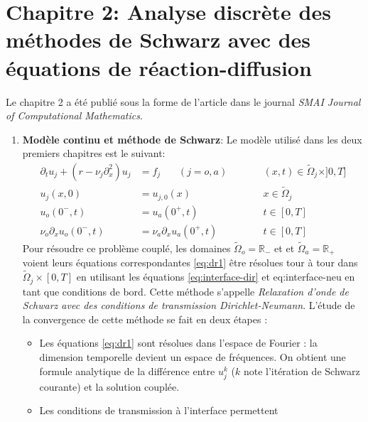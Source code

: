 \section*{Chapitre 2: Analyse discrète des méthodes de Schwarz avec des équations de réaction-diffusion}
Le chapitre 2 a été publié sous la forme de l'article
\citep{clement_discrete_2022-1} dans le journal
\textit{SMAI Journal of Computational Mathematics}.
\begin{enumerate}
\item \textbf{Modèle continu et méthode de Schwarz}:
Le modèle utilisé dans les deux premiers chapitres est le
suivant:
\begin{subequations}
\begin{align}
\partial_t u_j +( r - \nu_j \partial_x^2) u_j &= f_j ~~~~~~~~
(j=o,a) &\qquad&
	(x,t) \in \widetilde{\Omega}_j \times ]0,T] \label{eq:dr1} \\
u_j(x,0) &= u_{j,0}(x)   &\qquad&  x \in \widetilde{\Omega}_j  \\
u_o(0^-,t) &=  u_a(0^+,t) &\qquad& t \in [0,T] \label{eq:interface-dir} \\
\nu_o \partial_x u_o(0^-,t) &= \nu_a \partial_x u_a(0^+,t) &\qquad& t \in [0,T] \label{eq:interface-neu} 
\end{align}
\label{eq:resume_francais_model-problem}
\end{subequations}
Pour résoudre ce problème couplé, les domaines
$\widetilde{\Omega}_o = \mathbb{R_{-}}$ et
et $\widetilde{\Omega}_a = \mathbb{R_{+}}$ voient leurs équations
correspondantes \eqref{eq:dr1} être résolues tour à tour
dans $\widetilde{\Omega}_j \times [0,T]$
en utilisant les équations
\eqref{eq:interface-dir} et {eq:interface-neu}
en tant que conditions de bord.
Cette méthode s'appelle \textit{Relaxation d'onde de Schwarz avec
des conditions de transmission Dirichlet-Neumann}.
L'étude de la convergence de cette méthode se fait en deux étapes :
\begin{itemize}
\item Les équations \eqref{eq:dr1} sont résolues dans l'espace de
	Fourier : la dimension temporelle devient un espace
	de fréquences. On obtient une formule analytique de
	la différence entre $u_j^k$
	($k$ note l'itération de Schwarz courante)
	et la solution couplée.
\item Les conditions de transmission à l'interface permettent

\end{itemize}
\end{enumerate}
